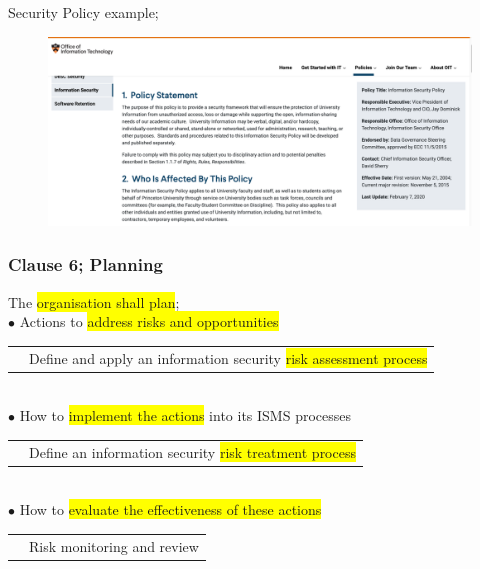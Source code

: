 \documentclass[tikz,border=10pt]{project_plan}
\newcommand{\bulletPoint}{\hspace{-3.1pt}$\bullet$ \hspace{5pt}}
\begin{document}
Security Policy example;
\begin{figure}[h!]
  \centering
  \includegraphics[width=\linewidth]{security_policy_example.png}
\end{figure}

\newpage

\subsubsection{Clause 6; Planning}
The \colorbox{yellow}{organisation shall plan};\\
\bulletPoint Actions to \colorbox{yellow}{address risks and opportunities}\\
\begin{tabular}{r |@{\bulletPoint} l}
   & Define and apply an information security \colorbox{yellow}{risk assessment process} \\
\end{tabular}\\
\bulletPoint How to \colorbox{yellow}{implement the actions} into its ISMS processes\\
\begin{tabular}{r |@{\bulletPoint} l}
   & Define an information security \colorbox{yellow}{risk treatment process} \\
\end{tabular}\\
\bulletPoint How to \colorbox{yellow}{evaluate the effectiveness of these actions}\\
\begin{tabular}{r |@{\bulletPoint} l}
   & Risk monitoring and review \\
\end{tabular}\\
\end{document}
